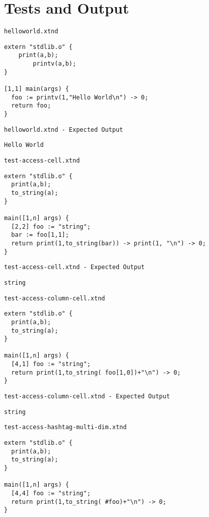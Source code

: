 \chapter{Tests and Output}


\medskip \noindent \texttt{helloworld.xtnd}


\begin{lstlisting}
extern "stdlib.o" {
	print(a,b);
		printv(a,b);
}

[1,1] main(args) {
  foo := printv(1,"Hello World\n") -> 0;
  return foo;
}
\end{lstlisting}


\medskip \noindent \texttt{helloworld.xtnd - Expected Output}


\begin{lstlisting}
Hello World
\end{lstlisting}


\medskip \noindent \texttt{test-access-cell.xtnd}


\begin{lstlisting}
extern "stdlib.o" {
  print(a,b);
  to_string(a);
}

main([1,n] args) {
  [2,2] foo := "string";
  bar := foo[1,1];
  return print(1,to_string(bar)) -> print(1, "\n") -> 0;
}
\end{lstlisting}


\medskip \noindent \texttt{test-access-cell.xtnd - Expected Output}


\begin{lstlisting}
string
\end{lstlisting}


\medskip \noindent \texttt{test-access-column-cell.xtnd}


\begin{lstlisting}
extern "stdlib.o" {
  print(a,b);
  to_string(a);
}

main([1,n] args) {
  [4,1] foo := "string";
  return print(1,to_string( foo[1,0])+"\n") -> 0;
}
\end{lstlisting}


\medskip \noindent \texttt{test-access-column-cell.xtnd - Expected Output}


\begin{lstlisting}
string
\end{lstlisting}


\medskip \noindent \texttt{test-access-hashtag-multi-dim.xtnd}


\begin{lstlisting}
extern "stdlib.o" {
  print(a,b);
  to_string(a);
}

main([1,n] args) {
  [4,4] foo := "string";
  return print(1,to_string( #foo)+"\n") -> 0;
}
\end{lstlisting}



